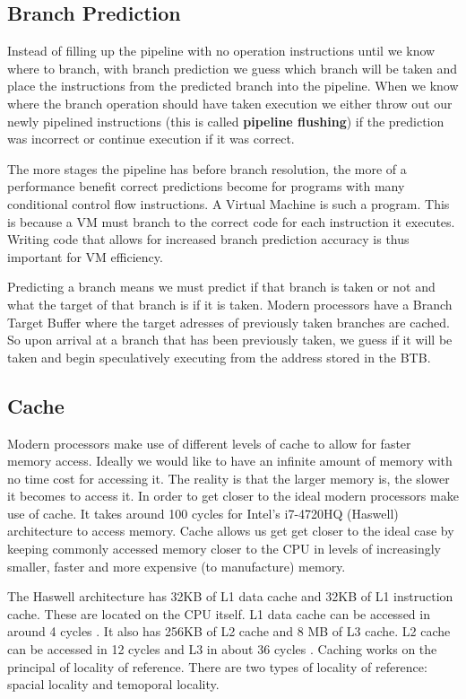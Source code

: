 \documentclass[english,a4paper]{report}
\begin{document}
\subsection{Branch Prediction}

Instead of filling up the pipeline with no operation instructions
until we know where to branch, with branch prediction we guess which
branch will be taken and place the instructions from the predicted
branch into the pipeline. When we know where the branch operation
should have taken execution we either throw out our newly pipelined
instructions (this is called \textbf{pipeline flushing}) if the
prediction was incorrect or continue execution if it was correct.

The more stages the pipeline has before branch resolution, the more of
a performance benefit correct predictions become for programs with
many conditional control flow instructions. A Virtual Machine is such
a program. This is because a VM must branch to the correct code for
each instruction it executes. Writing code that allows for increased
branch prediction accuracy is thus important for VM efficiency.

Predicting a branch means we must predict if that branch is taken or
not and what the target of that branch is if it is taken. Modern
processors have a Branch Target Buffer where the target adresses of
previously taken branches are cached. So upon arrival at a branch that
has been previously taken, we guess if it will be taken and begin
speculatively executing from the address stored in the BTB.

\subsection{Cache}

Modern processors make use of different levels of cache to allow for
faster memory access. Ideally we would like to have an infinite amount
of memory with no time cost for accessing it. The reality is that the
larger memory is, the slower it becomes to access it. In order to get
closer to the ideal modern processors make use of cache. It takes
around 100 cycles for Intel's i7-4720HQ (Haswell) architecture to
access memory. Cache allows us get get closer to the ideal case by
keeping commonly accessed memory closer to the CPU in levels of
increasingly smaller, faster and more expensive (to manufacture)
memory. 

The Haswell architecture has 32KB of L1 data cache and 32KB of L1
instruction cache. These are located on the CPU itself. L1 data cache
can be accessed in around 4 cycles \cite{7-cpu}. It also has 256KB of
L2 cache and 8 MB of L3 cache. L2 cache can be accessed in 12 cycles
and L3 in about 36 cycles \cite{7-cpu}. Caching works on the principal
of locality of reference. There are two types of locality of
reference: spacial locality and temoporal locality.
\end{document}
